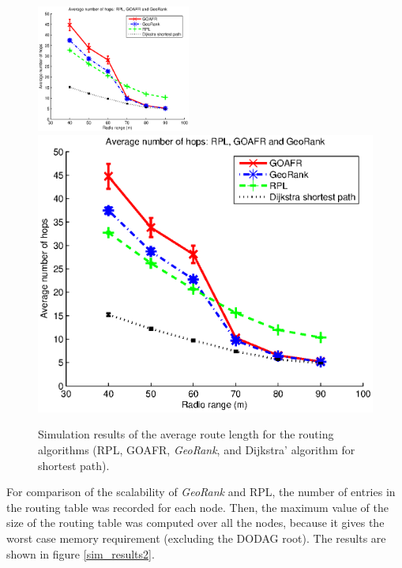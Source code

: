 \documentclass[final,authoryear,3p,twocolumn]{elsarticle}
\begin{document}
\begin{figure}
\centering
\ifdefined\TWOCOL
\includegraphics[width=0.45\textwidth]{figures/hops_range.eps}
\else
\includegraphics[width=1\textwidth]{hops_range.eps}
\fi
\caption{Simulation results of the average route length for the routing algorithms (RPL, GOAFR, \textit{GeoRank}, and Dijkstra' algorithm for shortest path).}
\label{sim_results}
\end{figure}

For comparison of the scalability of \textit{GeoRank} and RPL, the number of entries in the routing table was recorded for each node. Then, the maximum value of the size of the routing table was computed over all the nodes, because it gives the worst case memory requirement (excluding the DODAG root). The results are shown in figure \ref{sim_results2}.
\end{document}
